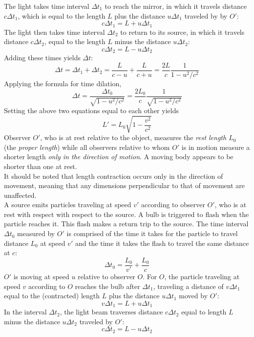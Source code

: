 \documentclass{subfiles}
\begin{document}
				The light takes time interval \(\Delta t_1\) to reach the mirror, in which it travels distance \(c\Delta t_1\), which is equal to the length \(L\) plus the distance \(u\Delta t_1\) traveled by by \(O'\):
				\[c\Delta t_1 = L + u\Delta t_1\]
				The light then takes time interval \(\Delta t_2\) to return to its source, in which it travels distance \(c\Delta t_2\), equal to the length \(L\) minus the distance \(u\Delta t_2\):
				\[c\Delta t_2 = L - u\Delta t_2\]
				Adding these times yields \(\Delta t\):
				\[
					\Delta t = \Delta t_1 + \Delta t_2
						= \frac{L}{c - u} + \frac{L}{c + u}
						= \frac{2L}{c}\frac{1}{1 - u^2/c^2}
				\]
				Applying the formula for time dilation,
				\[
					\Delta t = \frac{\Delta t_0}{\sqrt{1 - u^2/c^2}}
						= \frac{2L_0}{c}\frac{1}{\sqrt{1 - u^2/c^2}}
				\]
				Setting the above two equations equal to each other yields
				\[L' = L_0\sqrt{1 - \frac{v^2}{c^2}} \tag{length contraction}\]
				Observer \(O'\), who is at rest relative to the object, measures the \textit{rest length \(L_0\)} (the \textit{proper length}) while all observers relative to whom \(O'\) is in motion measure a shorter length \textit{only in the direction of motion}.
				A moving body appears to be shorter than one at rest. \\
				It should be noted that length contraction occurs only in the direction of movement, meaning that any dimensions perpendicular to that of movement are unaffected. \\
			A source emits particles traveling at speed \(v'\) according to observer \(O'\), who is at rest with respect with respect to the source. A bulb is triggered to flash when the particle reaches it. This flash makes a return trip to the source. The time interval \(\Delta t_0\) measured by \(O'\) is comprised of the time it takes for the particle to travel distance \(L_0\) at speed \(v'\) and the time it takes the flash to travel the same distance at \(c\):
				\[\Delta t_0 = \frac{L_0}{v'} + \frac{L_0}{c}\]
				\(O'\) is moving at speed \(u\) relative to observer \(O\). For \(O\), the particle traveling at speed \(v\) according to \(O\) reaches the bulb after \(\Delta t_1\), traveling a distance of \(v\Delta t_1\) equal to the (contracted) length \(L\) plus the distance \(u\Delta t_1\) moved by \(O'\):
				\[v\Delta t_1 = L + u\Delta t_1\]
				In the interval \(\Delta t_2\), the light beam traverses distance \(c\Delta t_2\) equal to length \(L\) minus the distance \(u\Delta t_2\) traveled by \(O'\):
				\[c\Delta t_2 = L - u\Delta t_2\]
\end{document}
